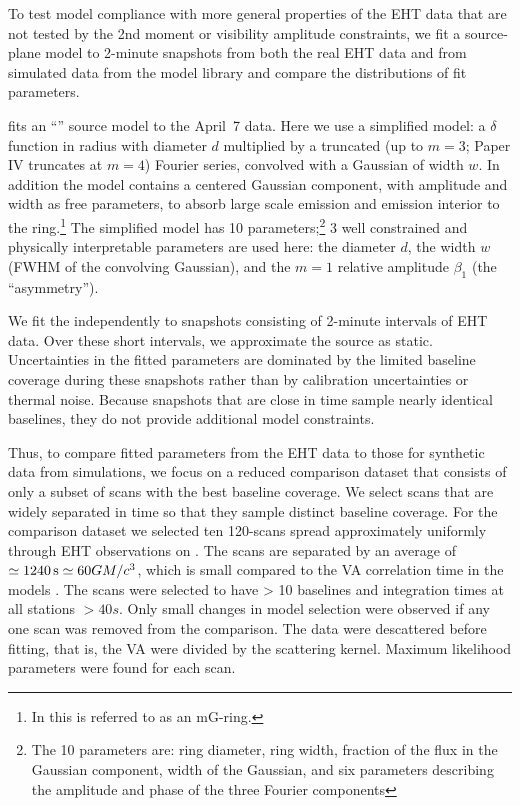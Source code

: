 To test model compliance with more general properties of the EHT data that are not tested by the 2nd moment or visibility amplitude constraints, we fit a source-plane model to 2-minute snapshots from both the real EHT data and from simulated data from the model library and compare the distributions of fit parameters.

 fits an ``\mring'' source model to the April~7 data.  Here we use a simplified \mring model: a $\delta$ function in radius with diameter $d$ multiplied by a truncated (up to $m = 3$; Paper IV truncates at $m = 4$) Fourier series, convolved with a Gaussian of width $w$.  In addition the model contains a centered Gaussian component, with amplitude and width as free parameters, to absorb large scale emission and emission interior to the ring.\footnote{In \cite{PaperIV} this is referred to as an mG-ring.}  The simplified \mring model has 10 parameters;\footnote{The 10 parameters are: ring diameter, ring width, fraction of the flux in the Gaussian component, width of the Gaussian, and six parameters describing the amplitude and phase of the three Fourier components} 3 well constrained and physically interpretable parameters are used here: the \mring diameter $d$, the \mring width $w$ (FWHM of the convolving  Gaussian), and the $m=1$ relative amplitude $\beta_1$ (the ``asymmetry'').

We fit the \mring independently to snapshots consisting of 2-minute intervals of EHT data. Over these short intervals, we approximate the source as static.  Uncertainties in the fitted \mring parameters are dominated by the limited baseline coverage during these snapshots rather than by calibration uncertainties or thermal noise. Because snapshots that are close in time sample nearly identical baselines, they do not provide additional model constraints.

Thus, to compare fitted \mring parameters from the EHT data to those for synthetic data from simulations, we focus on a reduced comparison dataset that consists of only a subset of scans with the best baseline coverage. We select scans that are widely separated in time so that they sample distinct baseline coverage. For the comparison dataset we selected ten 120-\sec scans spread approximately uniformly through EHT observations on \aprilvii.  The scans are separated by an average of $\simeq 1240\,\mathrm{s} \simeq 60 GM/c^3$, which is small compared to the VA correlation time in the models \citep{Georgiev_2022}. The scans were selected to have > 10 baselines and integration times at all stations $> 40s$.  Only small changes in model selection were observed if any one scan was removed from the comparison.  The data were descattered before fitting, that is, the VA were divided by the scattering kernel.  Maximum likelihood \mring parameters were found for each scan.

